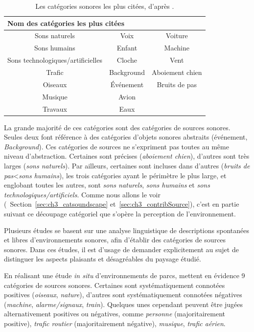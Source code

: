 \begin{table}[t]
\centering
\begin{tabular}{ccc}    
\multicolumn{3}{l}{Nom des catégories les plus citées} \\             
\hline
Sons naturels                    & Voix       & Voiture\\
Sons humains                     & Enfant     & Machine\\
Sons technologiques/artificielles & Cloche     & Vent \\
Trafic                           & Background & Aboiement chien\\
Oiseaux                          & Événement  & Bruits de pas\\
Musique                          & Avion      & \\
Travaux                          & Eaux       & \\
\hline
\end{tabular}
\vspace{0.5mm}
\caption[Les catégories sonores les plus citées.]{Les catégories sonores les plus citées, d'après \citep{niessen2010categories}.}
\label{tab:categoNiessen}
\end{table}

La grande majorité de ces catégories sont des catégories de sources sonores. Seules deux font référence à des catégories d'objets sonores abstraits (événement, \emph{Background}). Ces catégories de sources ne s'expriment pas toutes au même niveau d'abstraction. Certaines sont précises (\emph{aboiement chien}), d'autres sont très larges (\emph{sons naturels}). Par ailleurs, certaines sont incluses dans d'autres (\emph{bruits de pas}<\emph{sons humains}), les trois catégories ayant le périmètre le plus large, et englobant toutes les autres, sont \emph{sons naturels}, \emph{sons humains} et \emph{sons technologiques/artificiels}. Comme nous allons le voir (\cf~Section~\ref{sec:ch3_catsoundscape} et~\ref{sec:ch3_contribSource}), c'est en partie suivant ce découpage catégoriel que s'opère la perception de l'environnement.

Plusieurs études se basent sur une analyse linguistique de descriptions spontanées et libres d'environnements sonores, afin d'établir des catégories de sources sonores. Dans ces études, il est d'usage de demander explicitement au sujet de distinguer les aspects plaisants et désagréables du paysage étudié.

En réalisant une étude \emph{in situ} d'environnements de parcs, \citep{szeremeta2009analysis} mettent en évidence 9 catégories de sources sonores. Certaines sont systématiquement connotées positives (\emph{oiseaux}, \emph{nature}), d'autres sont systématiquement connotées négatives (\emph{machine}, \emph{alarme/signaux}, \emph{train}). Quelques unes cependant peuvent être jugées alternativement positives ou négatives, comme \emph{personne} (majoritairement positive), \emph{trafic routier} (majoritairement négative), \emph{musique}, \emph{trafic aérien}.

